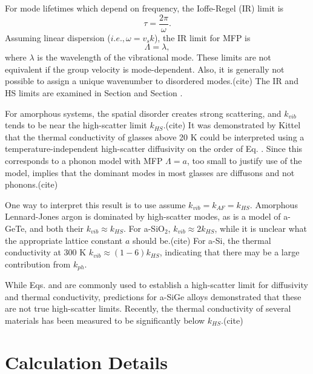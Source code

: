 \documentclass[aps,prb,twocolumn,superscriptaddress,footinbib,amsmath,amssymb,floatfix]{revtex4}
\begin{document}
For mode lifetimes which depend on frequency, the Ioffe-Regel (IR) limit 
is
\begin{equation}\label{EQ:IR}
\tau = \frac{2\pi}{\omega}.
\end{equation}
Assuming linear dispersion ($i.e., \omega = v_s k$), the IR limit for 
MFP is 
\begin{equation}\label{EQ:IR}
\Lambda = \lambda,
\end{equation}
where $\lambda$ is the wavelength of the vibrational mode. 
These limits are not equivalent if the group velocity 
is mode-dependent. Also, it is generally not possible to assign 
a unique wavenumber to disordered modes.(cite)  
The IR and HS limits are examined in Section 
and Section .

For amorphous systems, the 
spatial disorder creates strong scattering, and $k_{vib}$ tends to be 
near the high-scatter limit $k_{HS}$.(cite) 
It was demonstrated by Kittel that  
the thermal conductivity of glasses above 20 K could be interpreted 
using a temperature-independent high-scatter diffusivity on the order 
of Eq. .  
Since this corresponds to a phonon model with MFP $\Lambda = a$, 
too small to justify use of the model, implies that the dominant 
modes in most glasses are diffusons and not phonons.(cite)  

One way to interpret this result is to use assume 
$k_{vib} = k_{AF} = k_{HS}$. Amorphous Lennard-Jones argon is dominated 
by high-scatter modes,\cite{larkin_predicting_2013} as is a model of 
a-GeTe, and both their $k_{vib} \approx k_{HS}$.\cite{sosso_thermal_2012} 
For a-SiO$_2$, $k_{vib} \approx 2k_{HS}$, while it is unclear what the 
appropriate lattice constant $a$ should be.(cite)   
For a-Si, the thermal conductivity at 300 K $k_{vib} \approx (1-6) k_{HS}$, 
indicating that there may be a large contribution from $k_{ph}$. 

While Eqs. and are commonly used to establish a high-scatter limit for 
diffusivity and thermal conductivity, predictions for a-SiGe alloys 
demonstrated that these are not true high-scatter limits.
\cite{feldman_thermal_1993} Recently, the thermal conductivity 
of several materials has been measured to be significantly below 
$k_{HS}$.(cite) 


\section{\label{S:Calculation}Calculation Details}
\end{document}
